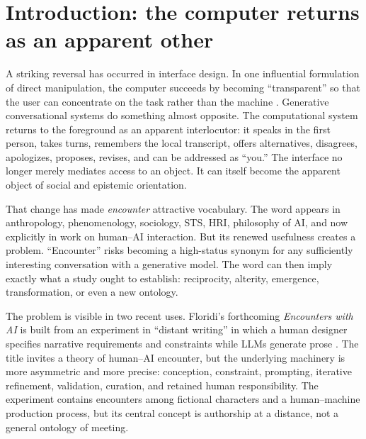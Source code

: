 \documentclass[11pt]{article}
\begin{document}
\section{Introduction: the computer returns as an apparent other}

A striking reversal has occurred in interface design. In one influential formulation of direct manipulation, the computer succeeds by becoming ``transparent'' so that the user can concentrate on the task rather than the machine \citep{Shneiderman1983Direct}. Generative conversational systems do something almost opposite. The computational system returns to the foreground as an apparent interlocutor: it speaks in the first person, takes turns, remembers the local transcript, offers alternatives, disagrees, apologizes, proposes, revises, and can be addressed as ``you.'' The interface no longer merely mediates access to an object. It can itself become the apparent object of social and epistemic orientation.

That change has made \emph{encounter} attractive vocabulary. The word appears in anthropology, phenomenology, sociology, STS, HRI, philosophy of AI, and now explicitly in work on human--AI interaction. But its renewed usefulness creates a problem. ``Encounter'' risks becoming a high-status synonym for any sufficiently interesting conversation with a generative model. The word can then imply exactly what a study ought to establish: reciprocity, alterity, emergence, transformation, or even a new ontology.

The problem is visible in two recent uses. Floridi's forthcoming \emph{Encounters with AI} is built from an experiment in ``distant writing'' in which a human designer specifies narrative requirements and constraints while LLMs generate prose \citep{Floridi2025DistantWriting,Floridi2027Encounters}. The title invites a theory of human--AI encounter, but the underlying machinery is more asymmetric and more precise: conception, constraint, prompting, iterative refinement, validation, curation, and retained human responsibility. The experiment contains encounters among fictional characters and a human--machine production process, but its central concept is authorship at a distance, not a general ontology of meeting.
\end{document}
